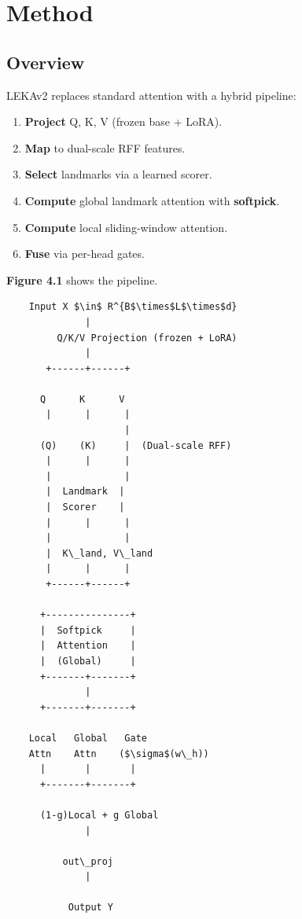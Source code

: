 \section{Method}

\subsection{Overview}

LEKAv2 replaces standard attention with a hybrid pipeline:

\begin{enumerate}
\item \textbf{Project} Q, K, V (frozen base + LoRA).
\item \textbf{Map} to dual-scale RFF features.
\item \textbf{Select} landmarks via a learned scorer.
\item \textbf{Compute} global landmark attention with \textbf{softpick}.
\item \textbf{Compute} local sliding-window attention.
\item \textbf{Fuse} via per-head gates.

\end{enumerate}
\textbf{Figure 4.1} shows the pipeline.

\begin{lstlisting}
    Input X $\in$ R^{B$\times$L$\times$d}
              |
         Q/K/V Projection (frozen + LoRA)
              |
       +------+------+
                      
      Q      K      V
       |      |      |
                     |
      (Q)    (K)     |  (Dual-scale RFF)
       |      |      |
       |             |
       |  Landmark  |
       |  Scorer    |
       |      |      |
       |             |
       |  K\_land, V\_land
       |      |      |
       +------+------+
               
      +---------------+
      |  Softpick     |
      |  Attention    |
      |  (Global)     |
      +-------+-------+
              |
      +-------+-------+
                       
    Local   Global   Gate
    Attn    Attn    ($\sigma$(w\_h))
      |       |       |
      +-------+-------+
               
      (1-g)Local + g Global
              |
               
          out\_proj
              |
               
           Output Y
\end{lstlisting}

